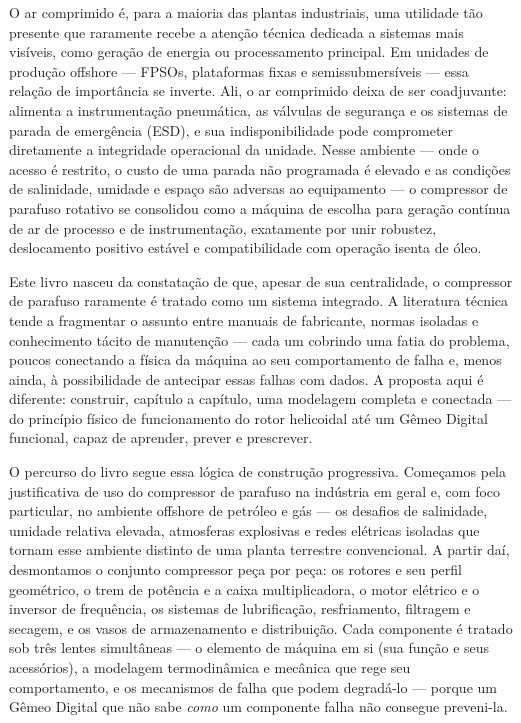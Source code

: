 \documentclass[12pt,a4paper]{article}
\numberwithin{equation}{section}
\numberwithin{table}{section}
\numberwithin{figure}{section}
\begin{document}
O ar comprimido é, para a maioria das plantas industriais, uma utilidade tão presente que raramente recebe a atenção técnica dedicada a sistemas mais visíveis, como geração de energia ou processamento principal. Em unidades de produção offshore — FPSOs, plataformas fixas e semissubmersíveis — essa relação de importância se inverte. Ali, o ar comprimido deixa de ser coadjuvante: alimenta a instrumentação pneumática, as válvulas de segurança e os sistemas de parada de emergência (ESD), e sua indisponibilidade pode comprometer diretamente a integridade operacional da unidade. Nesse ambiente — onde o acesso é restrito, o custo de uma parada não programada é elevado e as condições de salinidade, umidade e espaço são adversas ao equipamento — o compressor de parafuso rotativo se consolidou como a máquina de escolha para geração contínua de ar de processo e de instrumentação, exatamente por unir robustez, deslocamento positivo estável e compatibilidade com operação isenta de óleo.

Este livro nasceu da constatação de que, apesar de sua centralidade, o compressor de parafuso raramente é tratado como um sistema integrado. A literatura técnica tende a fragmentar o assunto entre manuais de fabricante, normas isoladas e conhecimento tácito de manutenção — cada um cobrindo uma fatia do problema, poucos conectando a física da máquina ao seu comportamento de falha e, menos ainda, à possibilidade de antecipar essas falhas com dados. A proposta aqui é diferente: construir, capítulo a capítulo, uma modelagem completa e conectada — do princípio físico de funcionamento do rotor helicoidal até um Gêmeo Digital funcional, capaz de aprender, prever e prescrever.

O percurso do livro segue essa lógica de construção progressiva. Começamos pela justificativa de uso do compressor de parafuso na indústria em geral e, com foco particular, no ambiente offshore de petróleo e gás — os desafios de salinidade, umidade relativa elevada, atmosferas explosivas e redes elétricas isoladas que tornam esse ambiente distinto de uma planta terrestre convencional. A partir daí, desmontamos o conjunto compressor peça por peça: os rotores e seu perfil geométrico, o trem de potência e a caixa multiplicadora, o motor elétrico e o inversor de frequência, os sistemas de lubrificação, resfriamento, filtragem e secagem, e os vasos de armazenamento e distribuição. Cada componente é tratado sob três lentes simultâneas — o elemento de máquina em si (sua função e seus acessórios), a modelagem termodinâmica e mecânica que rege seu comportamento, e os mecanismos de falha que podem degradá-lo — porque um Gêmeo Digital que não sabe \textit{como} um componente falha não consegue preveni-la.
\end{document}
